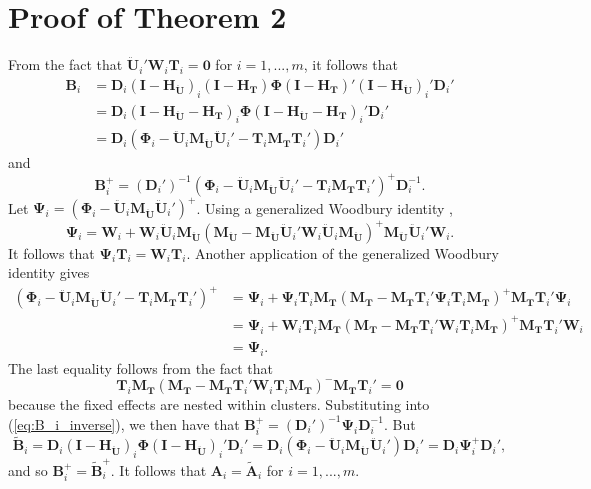 \documentclass{article}\usepackage[]{graphicx}\usepackage[]{color}
\newcommand{\bm}{\mathbf}
\newcommand{\bs}{\boldsymbol}
\begin{document}
\newpage
\section{Proof of Theorem 2}

From the fact that $\bm{\ddot{U}}_i'\bm{W}_i\bm{T}_i = \bm{0}$ for $i = 1,...,m$, it follows that \begin{align*}
\bm{B}_i &= \bm{D}_i \left(\bm{I} - \bm{H_{\ddot{U}}}\right)_i \left(\bm{I} - \bm{H_T}\right) \bs\Phi \left(\bm{I} - \bm{H_T}\right)' \left(\bm{I} - \bm{H_{\ddot{U}}}\right)_i' \bm{D}_i'\\
&= \bm{D}_i \left(\bm{I} - \bm{H_{\ddot{U}}} - \bm{H_T}\right)_i \bs\Phi \left(\bm{I} - \bm{H_{\ddot{U}}} - \bm{H_T}\right)_i' \bm{D}_i' \\
&= \bm{D}_i \left(\bs\Phi_i - \bm{\ddot{U}}_i \bm{M_{\ddot{U}}}\bm{\ddot{U}}_i' - \bm{T}_i \bm{M_T}\bm{T}_i'\right)\bm{D}_i'
\end{align*}
and 
\begin{equation}
\label{eq:B_i_inverse}
\bm{B}_i^+ = \left(\bm{D}_i'\right)^{-1} \left(\bs\Phi_i - \bm{\ddot{U}}_i \bm{M_{\ddot{U}}}\bm{\ddot{U}}_i' - \bm{T}_i \bm{M_T}\bm{T}_i'\right)^+ \bm{D}_i^{-1}.
\end{equation}
Let $\bs\Psi_i = \left(\bs\Phi_i - \bm{\ddot{U}}_i \bm{M_{\ddot{U}}}\bm{\ddot{U}}_i'\right)^+$.
Using a generalized Woodbury identity \citep{Henderson1981on}, \[
\bs\Psi_i = \bm{W}_i + \bm{W}_i \bm{\ddot{U}}_i \bm{M_{\ddot{U}}}\left(\bm{M_{\ddot{U}}} - \bm{M_{\ddot{U}}} \bm{\ddot{U}}_i' \bm{W}_i \bm{\ddot{U}}_i \bm{M_{\ddot{U}}}\right)^+ \bm{M_{\ddot{U}}}\bm{\ddot{U}}_i'\bm{W}_i. \]
It follows that $\bs\Psi_i \bm{T}_i = \bm{W}_i \bm{T}_i$. 
Another application of the generalized Woodbury identity gives 
\begin{align*}
\left(\bs\Phi_i - \bm{\ddot{U}}_i \bm{M_{\ddot{U}}}\bm{\ddot{U}}_i' - \bm{T}_i \bm{M_T}\bm{T}_i'\right)^+ &= \bs\Psi_i + \bs\Psi_i \bm{T}_i \bm{M_T}\left(\bm{M_T} - \bm{M_T}\bm{T}_i' \bs\Psi_i \bm{T}_i \bm{M_T}\right)^+ \bm{M_T} \bm{T}_i' \bs\Psi_i \\
&= \bs\Psi_i + \bm{W}_i \bm{T}_i \bm{M_T}\left(\bm{M_T} - \bm{M_T}\bm{T}_i' \bm{W}_i \bm{T}_i\bm{M_T}\right)^+ \bm{M_T} \bm{T}_i' \bm{W}_i \\
&= \bs\Psi_i.
\end{align*}
The last equality follows from the fact that \[
\bm{T}_i \bm{M_T}\left(\bm{M_T} - \bm{M_T}\bm{T}_i' \bm{W}_i \bm{T}_i\bm{M_T}\right)^{-} \bm{M_T} \bm{T}_i' = \bm{0} \]
because the fixed effects are nested within clusters. 
Substituting into (\ref{eq:B_i_inverse}), we then have that $\bm{B}_i^+ = \left(\bm{D}_i'\right)^{-1} \bs\Psi_i \bm{D}_i^{-1}$. 
But \[
\bm{\tilde{B}}_i = \bm{D}_i \left(\bm{I} - \bm{H_{\ddot{U}}}\right)_i \bs\Phi \left(\bm{I} - \bm{H_{\ddot{U}}}\right)_i' \bm{D}_i' = \bm{D}_i \left(\bs\Phi_i - \bm{\ddot{U}}_i\bm{M_{\ddot{U}}} \bm{\ddot{U}}_i'\right) \bm{D}_i' = \bm{D}_i \bs\Psi_i^+ \bm{D}_i',
\]
and so $\bm{B}_i^+ = \bm{\tilde{B}}_i^+$. It follows that $\bm{A}_i = \bm{\tilde{A}}_i$ for $i = 1,...,m$. 
\end{document}
